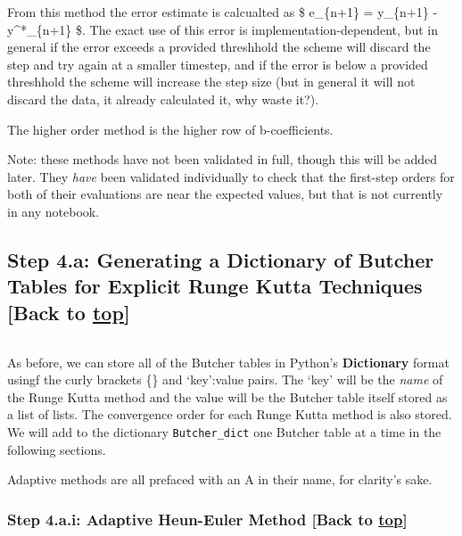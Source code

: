 \documentclass[landscape,letterpaper,10pt,english]{article}
\begin{document}
From this method the error estimate is calcualted as \$ e\_\{n+1\} =
y\_\{n+1\} - y\^{}*\_\{n+1\} \$. The exact use of this error is
implementation-dependent, but in general if the error exceeds a provided
threshhold the scheme will discard the step and try again at a smaller
timestep, and if the error is below a provided threshhold the scheme
will increase the step size (but in general it will not discard the
data, it already calculated it, why waste it?).

The higher order method is the higher row of b-coefficients.

Note: these methods have not been validated in full, though this will be
added later. They \emph{have} been validated individually to check that
the first-step orders for both of their evaluations are near the
expected values, but that is not currently in any notebook.

    \hypertarget{step-4.a-generating-a-dictionary-of-butcher-tables-for-explicit-runge-kutta-techniques-back-to-top}{%
\subsection{\texorpdfstring{Step 4.a: Generating a Dictionary of Butcher
Tables for Explicit Runge Kutta Techniques {[}Back to
\hyperref[toc]{top}{]}}{Step 4.a: Generating a Dictionary of Butcher Tables for Explicit Runge Kutta Techniques {[}Back to {]}}}\label{step-4.a-generating-a-dictionary-of-butcher-tables-for-explicit-runge-kutta-techniques-back-to-top}}

\[\label{codebutchera}\]

As before, we can store all of the Butcher tables in Python's
\textbf{Dictionary} format usingf the curly brackets \{\} and
`key':value pairs. The `key' will be the \emph{name} of the Runge Kutta
method and the value will be the Butcher table itself stored as a list
of lists. The convergence order for each Runge Kutta method is also
stored. We will add to the dictionary \texttt{Butcher\_dict} one Butcher
table at a time in the following sections.

Adaptive methods are all prefaced with an A in their name, for clarity's
sake.

    \hypertarget{step-4.a.i-adaptive-heun-euler-method-back-to-top}{%
\subsubsection{\texorpdfstring{Step 4.a.i: Adaptive Heun-Euler Method
{[}Back to
\hyperref[toc]{top}{]}}{Step 4.a.i: Adaptive Heun-Euler Method {[}Back to {]}}}\label{step-4.a.i-adaptive-heun-euler-method-back-to-top}}
\end{document}
